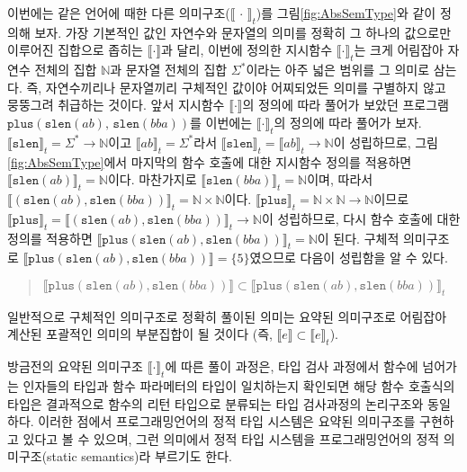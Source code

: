 이번에는 같은 언어에 때한 다른 의미구조($\llbracket\,\cdot\,\rrbracket_t$)를
그림\;\ref{fig:AbsSemType}와 같이 정의해 보자. 가장 기본적인 값인 자연수와
문자열의 의미를 정확히 그 하나의 값으로만 이루어진 집합으로 좁히는
$\llbracket\cdot\rrbracket$과 달리, 이번에 정의한 지시함수
$\llbracket\cdot\rrbracket_t$는 크게 어림잡아 자연수 전체의 집합 $\mathbb{N}$과
문자열 전체의 집합 $\Sigma^{*}$이라는 아주 넓은 범위를 그 의미로 삼는다.
즉, 자연수끼리나 문자열끼리 구체적인 값이야 어찌되었든 의미를 구별하지 않고
뭉뚱그려 취급하는 것이다. 앞서 지시함수 $\llbracket\cdot\rrbracket$의 정의에 따라
풀어가 보았던 프로그램 $\texttt{plus}(\texttt{slen}(ab),\,\texttt{slen}(bba))$를
이번에는 $\llbracket\cdot\rrbracket_t$의 정의에 따라 풀어가 보자.
$\llbracket\texttt{slen}\rrbracket_t = \Sigma^{*}\to\mathbb{N}$이고
$\llbracket ab\rrbracket_t = \Sigma^{*}$라서
$\llbracket\texttt{slen}\rrbracket_t = \llbracket ab\rrbracket_t \to \mathbb{N}$이
성립하므로, 그림\;\ref{fig:AbsSemType}에서 마지막의 함수 호출에 대한 지시함수
정의를 적용하면 $\llbracket\texttt{slen}(ab)\rrbracket_t = \mathbb{N}$이다.
마찬가지로 $\llbracket\texttt{slen}(bba)\rrbracket_t = \mathbb{N}$이며,
따라서 $\llbracket(\texttt{slen}(ab),\texttt{slen}(bba))\rrbracket_t
                      = \mathbb{N} \times \mathbb{N}$이다.
$\llbracket\texttt{plus}\rrbracket_t = \mathbb{N}\times\mathbb{N}\to\mathbb{N}$이므로
$\llbracket\texttt{plus}\rrbracket_t
 = \llbracket(\texttt{slen}(ab),\texttt{slen}(bba))\rrbracket_t\to\mathbb{N}$이
성립하므로, 다시 함수 호출에 대한 정의를 적용하면
$\llbracket\texttt{plus}(\texttt{slen}(ab),\texttt{slen}(bba))\rrbracket_t 
 = \mathbb{N}$이 된다. 구체적 의미구조로
 $\llbracket\texttt{plus}(\texttt{slen}(ab),\texttt{slen}(bba))\rrbracket
 = \{5\}$였으므로 다음이 성립함을 알 수 있다.\vspace*{-1ex}
\begin{quote}
$\llbracket\texttt{plus}(\texttt{slen}(ab),\texttt{slen}(bba))\rrbracket \subset
 \llbracket\texttt{plus}(\texttt{slen}(ab),\texttt{slen}(bba))\rrbracket_t$
\vspace*{-1ex}
\end{quote} 
일반적으로 구체적인 의미구조로 정확히 풀이된 의미는 요약된 의미구조로
어림잡아 계산된 포괄적인 의미의 부분집합이 될 것이다
(즉, $\llbracket e\rrbracket \subset \llbracket e\rrbracket_t$).
 
방금전의 요약된 의미구조 $\llbracket\cdot\rrbracket_t$에 따른 풀이 과정은,
타입 검사 과정에서 함수에 넘어가는 인자들의 타입과 함수 파라메터의 타입이
일치하는지 확인되면 해당 함수 호출식의 타입은 결과적으로 함수의 리턴 타입으로
분류되는 타입 검사과정의 논리구조와 동일하다. 이러한 점에서 프로그래밍언어의
정적 타입 시스템은 요약된 의미구조를 구현하고 있다고 볼 수 있으며, 그런
의미에서 정적 타입 시스템을 프로그래밍언어의 정적 의미구조(static semantics)라
부르기도 한다.

